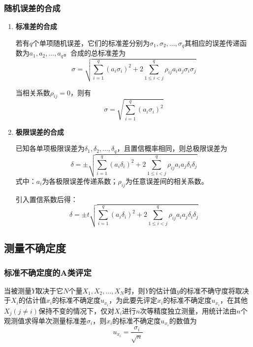 \subsubsection{随机误差的合成}
\begin{enumerate}
	\item \textbf{标准差的合成}
	
	\qquad 若有$ q $个单项随机误差，它们的标准差分别为$ \sigma_1,\sigma_2,...,\sigma_q $其相应的误差传递函数为$ a_1,a_2,...,a_q $。合成的总标准差为\begin{equation} \sigma=\sqrt{\sum_{i=1}^{q}(a_i\sigma_i)^2+2\sum_{1\leq i<j}^{q}\rho_{ij}a_ia_j\sigma_i\sigma_j} \end{equation}
	
	\qquad 当相关系数$ \rho_{ij}=0 $，则有\begin{equation} \sigma=\sqrt{\sum_{i=1}^{q}(a_i\sigma_i)^2} \end{equation}
	\item \textbf{极限误差的合成}
	
	\qquad  已知各单项极限误差为$ \delta_1,\delta_2,...,\delta_q $，且置信概率相同，则总极限误差为\begin{equation} \delta=\pm\sqrt{\sum_{i=1}^{q}(a_i\delta_i)^2+2\sum_{1\le i<j}^{q}\rho_{ij}a_ia_j\delta_i\delta_j} \end{equation}
	式中：$ a_i $为各极限误差传递系数；$ \rho_{ij} $为任意误差间的相关系数。
	
	\qquad 引入置信系数后得：\begin{equation} \delta=\pm t\sqrt{\sum_{i=1}^{q}(a_i\delta_i)^2+2\sum_{1\le i<j}^{q}\rho_{ij}a_ia_j\delta_i\delta_j} \end{equation}
\end{enumerate}

\subsection{测量不确定度}
\subsubsection{标准不确定度的A类评定}
当被测量$ Y $取决于它$ N $个量$ X_1,X_2,...,X_N $时，则$ Y $的估计值$ y $的标准不确守度将取决于$ X_i $的估计值$ x_i $的标准不确定度$ u_{x_i} $，为此要先评定$ x_i $的标准不确定度$ u_{x_i} $，在其他$ X_j(j\neq i) $保持不变的情况下，仅对$ X_i $进行$ n $次等精度独立测量，用统计法由$ n $个观测值求得单次测量标准差$ \sigma_i $，则$ x_i $的标准不确定度$ u_{x_i} $的数值为\begin{equation} u_{x_i}=\frac{\sigma_i}{\sqrt{n}} \end{equation}
